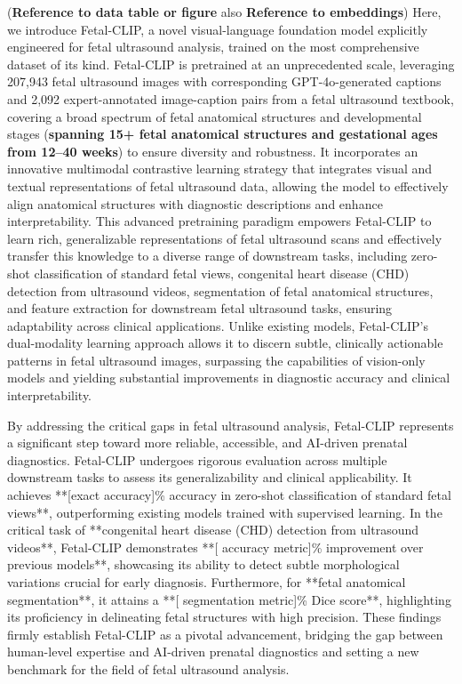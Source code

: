 {\color{red}(\textbf{Reference to data table or figure} also \textbf{Reference to embeddings})} Here, we introduce Fetal-CLIP, a novel visual-language foundation model explicitly engineered for fetal ultrasound analysis, trained on the most comprehensive dataset of its kind. Fetal-CLIP is pretrained at an unprecedented scale, leveraging 207,943 fetal ultrasound images with corresponding GPT-4o-generated captions and 2,092 expert-annotated image-caption pairs from a fetal ultrasound textbook, covering a broad spectrum of fetal anatomical structures and developmental stages {\color{red}(\textbf{spanning 15+ fetal anatomical structures and gestational ages from 12–40 weeks})} to ensure diversity and robustness. It incorporates an innovative multimodal contrastive learning strategy that integrates visual and textual representations of fetal ultrasound data, allowing the model to effectively align anatomical structures with diagnostic descriptions and enhance interpretability. This advanced pretraining paradigm empowers Fetal-CLIP to learn rich, generalizable representations of fetal ultrasound scans and effectively transfer this knowledge to a diverse range of downstream tasks, including zero-shot classification of standard fetal views, congenital heart disease (CHD) detection from ultrasound videos, segmentation of fetal anatomical structures, and feature extraction for downstream fetal ultrasound tasks, ensuring adaptability across clinical applications. Unlike existing models, Fetal-CLIP’s dual-modality learning approach allows it to discern subtle, clinically actionable patterns in fetal ultrasound images, surpassing the capabilities of vision-only models and yielding substantial improvements in diagnostic accuracy and clinical interpretability. 

By addressing the critical gaps in fetal ultrasound analysis, Fetal-CLIP represents a significant step toward more reliable, accessible, and AI-driven prenatal diagnostics. Fetal-CLIP undergoes rigorous evaluation across multiple downstream tasks to assess its generalizability and clinical applicability. It achieves **[exact accuracy]\% accuracy in zero-shot classification of standard fetal views**, outperforming existing models trained with supervised learning. In the critical task of **congenital heart disease (CHD) detection from ultrasound videos**, Fetal-CLIP demonstrates **[ accuracy metric]\% improvement over previous models**, showcasing its ability to detect subtle morphological variations crucial for early diagnosis. Furthermore, for **fetal anatomical segmentation**, it attains a **[ segmentation metric]\% Dice score**, highlighting its proficiency in delineating fetal structures with high precision. These findings firmly establish Fetal-CLIP as a pivotal advancement, bridging the gap between human-level expertise and AI-driven prenatal diagnostics and setting a new benchmark for the field of fetal ultrasound analysis.

